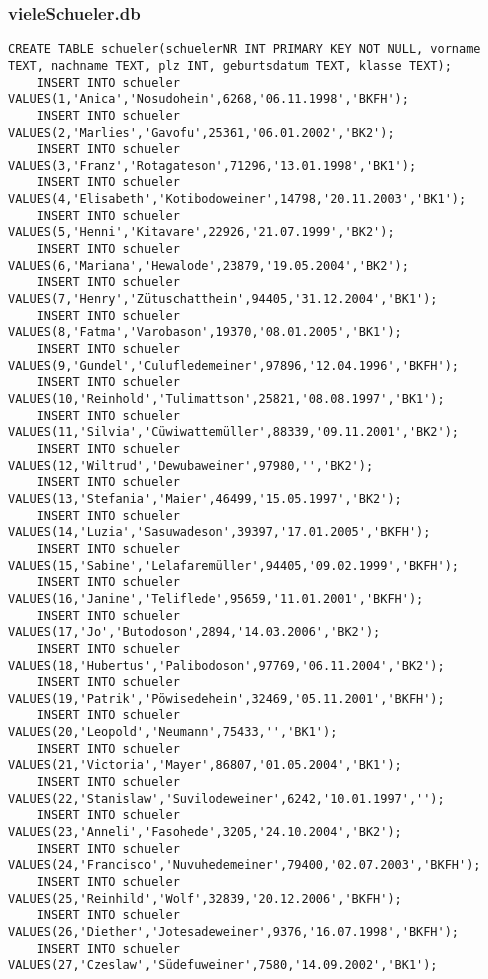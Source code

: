 \subsubsection{vieleSchueler.db}
\begin{lstlisting}[breaklines=True, numbers=none, basicstyle=\tiny, keepspaces=false]
	CREATE TABLE schueler(schuelerNR INT PRIMARY KEY NOT NULL, vorname TEXT, nachname TEXT, plz INT, geburtsdatum TEXT, klasse TEXT);
	INSERT INTO schueler VALUES(1,'Anica','Nosudohein',6268,'06.11.1998','BKFH');
	INSERT INTO schueler VALUES(2,'Marlies','Gavofu',25361,'06.01.2002','BK2');
	INSERT INTO schueler VALUES(3,'Franz','Rotagateson',71296,'13.01.1998','BK1');
	INSERT INTO schueler VALUES(4,'Elisabeth','Kotibodoweiner',14798,'20.11.2003','BK1');
	INSERT INTO schueler VALUES(5,'Henni','Kitavare',22926,'21.07.1999','BK2');
	INSERT INTO schueler VALUES(6,'Mariana','Hewalode',23879,'19.05.2004','BK2');
	INSERT INTO schueler VALUES(7,'Henry','Zütuschatthein',94405,'31.12.2004','BK1');
	INSERT INTO schueler VALUES(8,'Fatma','Varobason',19370,'08.01.2005','BK1');
	INSERT INTO schueler VALUES(9,'Gundel','Culufledemeiner',97896,'12.04.1996','BKFH');
	INSERT INTO schueler VALUES(10,'Reinhold','Tulimattson',25821,'08.08.1997','BK1');
	INSERT INTO schueler VALUES(11,'Silvia','Cüwiwattemüller',88339,'09.11.2001','BK2');
	INSERT INTO schueler VALUES(12,'Wiltrud','Dewubaweiner',97980,'','BK2');
	INSERT INTO schueler VALUES(13,'Stefania','Maier',46499,'15.05.1997','BK2');
	INSERT INTO schueler VALUES(14,'Luzia','Sasuwadeson',39397,'17.01.2005','BKFH');
	INSERT INTO schueler VALUES(15,'Sabine','Lelafaremüller',94405,'09.02.1999','BKFH');
	INSERT INTO schueler VALUES(16,'Janine','Teliflede',95659,'11.01.2001','BKFH');
	INSERT INTO schueler VALUES(17,'Jo','Butodoson',2894,'14.03.2006','BK2');
	INSERT INTO schueler VALUES(18,'Hubertus','Palibodoson',97769,'06.11.2004','BK2');
	INSERT INTO schueler VALUES(19,'Patrik','Pöwisedehein',32469,'05.11.2001','BKFH');
	INSERT INTO schueler VALUES(20,'Leopold','Neumann',75433,'','BK1');
	INSERT INTO schueler VALUES(21,'Victoria','Mayer',86807,'01.05.2004','BK1');
	INSERT INTO schueler VALUES(22,'Stanislaw','Suvilodeweiner',6242,'10.01.1997','');
	INSERT INTO schueler VALUES(23,'Anneli','Fasohede',3205,'24.10.2004','BK2');
	INSERT INTO schueler VALUES(24,'Francisco','Nuvuhedemeiner',79400,'02.07.2003','BKFH');
	INSERT INTO schueler VALUES(25,'Reinhild','Wolf',32839,'20.12.2006','BKFH');
	INSERT INTO schueler VALUES(26,'Diether','Jotesadeweiner',9376,'16.07.1998','BKFH');
	INSERT INTO schueler VALUES(27,'Czeslaw','Südefuweiner',7580,'14.09.2002','BK1');

\end{lstlisting}
